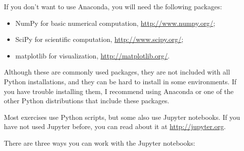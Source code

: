 \documentclass[12pt]{book}
\begin{document}
If you don't want to use Anaconda, you will need the following
packages:

\begin{itemize}

\item NumPy for basic numerical computation, \url{http://www.numpy.org/};

\item SciPy for scientific computation,
  \url{http://www.scipy.org/};

\item matplotlib for visualization, \url{http://matplotlib.org/}.

\end{itemize}

Although these are commonly used packages, they are not included with
all Python installations, and they can be hard to install in some
environments.  If you have trouble installing them, I
recommend using Anaconda or one of the other Python distributions
that include these packages.

Most exercises use Python scripts, but some also use Jupyter
notebooks.  If you have not used Jupyter before, you can read about
it at \url{http://jupyter.org}.

There are three ways you can work with the Jupyter notebooks:
\end{document}
